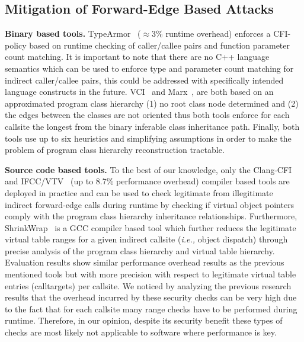 \subsection{Mitigation of Forward-Edge Based Attacks}
\label{C++ Indirect Calls in Practice}
\textbf{Binary based tools.} TypeArmor~\cite{veen:typearmor}
($\approx$3\% runtime overhead) enforces a CFI-policy based on runtime checking of caller/callee pairs and function parameter count matching. It is important to note 
that there are no C++ language semantics which can be used to enforce type and parameter count matching for indirect caller/callee pairs, this could be addressed
with specifically intended language constructs in the future.
VCI~\cite{vci:asiaccs} and Marx~\cite{marx}, are both based on an approximated program class hierarchy  
(1) no root class node determined and (2) the edges between the classes are not oriented thus both tools enforce for each callsite the longest
from the binary inferable class inheritance path. Finally, both tools use up to six heuristics and simplifying assumptions in order 
to make the problem of program class hierarchy reconstruction tractable.

\textbf{Source code based tools.} 
To the best of our knowledge, only the Clang-CFI \cite{clang:cfi} and IFCC/VTV~\cite{vtv:tice} (up to 8.7\% performance overhead) compiler based tools are deployed in practice
and can be used to check legitimate from illegitimate indirect forward-edge calls during runtime by checking if virtual object pointers comply with 
the program class hierarchy inheritance relationships.
Furthermore, ShrinkWrap~\cite{haller:shrinkwrap} is a GCC compiler based tool which further reduces the legitimate 
virtual table ranges for a given indirect callsite (\textit{i.e.,} object dispatch) through precise analysis of the program class hierarchy and virtual table hierarchy. Evaluation results
show similar performance overhead results as the previous mentioned tools but with more precision with respect to legitimate virtual table entries (calltargets) per callsite. 
We noticed by analyzing the previous research results that the overhead incurred by these security checks can be very high due to the fact that for each callsite many range checks have to be
performed during runtime. Therefore, in our opinion, despite its security benefit these types of checks are most likely not 
applicable to software where performance is key.

